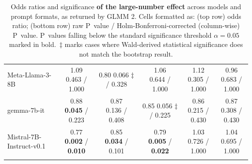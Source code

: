 \documentclass[11pt]{article}
\newcommand{\pbdesc}{P~values falling below the standard significance threshold $\alpha=0.05$ marked in bold.}
\newcommand{\ddagdesc}{$\ddagger$ marks cases where Wald-derived statistical significance does not match the bootstrap result.}
\begin{document}
\begin{table}[H]
\begin{tabular}{lccccc}
Meta-Llama-3-8B & \makecell{1.09 \\ 0.463 / 1.000} & \makecell{0.80 \\ 0.066 $\ddagger$ / 0.328} & \makecell{1.06 \\ 0.644 / 1.000} & \makecell{1.12 \\ 0.305 / 1.000} & \makecell{0.96 \\ 0.683 / 1.000} \\ \addlinespace
gemma-7b-it & \makecell{0.88 \\ \textbf{0.045} / 0.223} & \makecell{0.87 \\ 0.136 / 0.408} & \makecell{0.85 \\ 0.056 $\ddagger$ / 0.225} & \makecell{0.86 \\ 0.215 / 0.430} & \makecell{0.87 \\ 0.308 / 0.430} \\ \addlinespace
Mistral-7B-Instruct-v0.1 & \makecell{0.77 \\ \textbf{0.002} / \textbf{0.010}} & \makecell{0.85 \\ \textbf{0.034} / 0.101} & \makecell{0.79 \\ \textbf{0.005} / \textbf{0.022}} & \makecell{1.03 \\ 0.726 / 1.000} & \makecell{1.04 \\ 0.695 / 1.000} \\ \addlinespace
\bottomrule
\end{tabular}
\caption{Odds ratios and significance \textbf{of the large-number effect} across models and prompt formats, as returned by GLMM 2. Cells formatted as: (top row) odds ratio; (bottom row) raw P~value / Holm-Bonferroni-corrected (column-wise) P~value. \pbdesc\ \ddagdesc}
\label{tab:number_effect_odds}
\end{table}

\newpage
\end{document}
